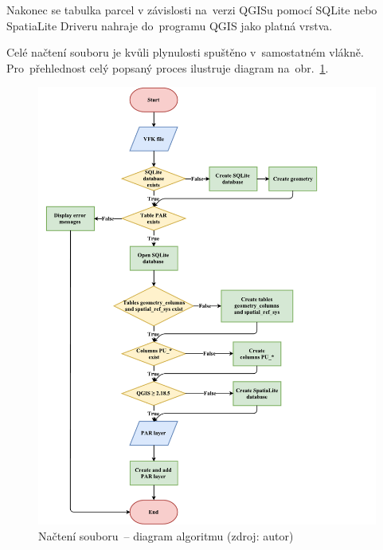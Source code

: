 Nakonec se tabulka parcel v závislosti na~verzi QGISu pomocí SQLite
nebo SpatiaLite Driveru nahraje do~programu QGIS jako platná vrstva.

Celé načtení  souboru je kvůli plynulosti spuštěno v~samostatném
vlákně. Pro~přehlednost celý popsaný proces ilustruje diagram
na~obr.~\ref{fig:diagram_nacitani_vfk}.


	\begin{figure}[H] \centering
		\includegraphics[width=1.2\textwidth]{./pictures/nacitani_vfk_souboru.pdf}
		\caption[Načtení  souboru~– diagram
algoritmu]{Načtení  souboru~– diagram algoritmu (zdroj: autor)}
		\label{fig:diagram_nacitani_vfk}
 	\end{figure}

